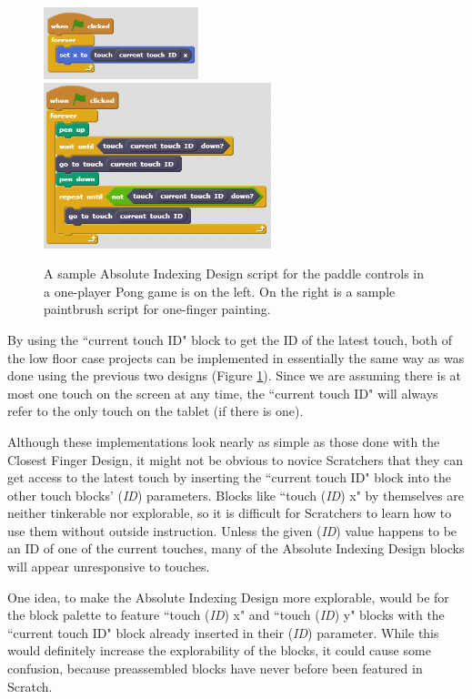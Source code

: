 \begin{figure}
\centering
\includegraphics[width=0.4\textwidth]{images/OnePlayerPongAID.PNG}
\includegraphics[width=0.59\textwidth]{images/OneFingerPaintingAID.PNG}
\caption[Sample Absolute Indexing Design Scripts for Low Floor Case Projects]{A sample Absolute Indexing Design script for the paddle controls in a one-player Pong game is on the left. On the right is a sample paintbrush script for one-finger painting.}
\label{LowFloorAID}
\end{figure}

By using the ``current touch ID" block to get the ID of the latest touch, both of the low floor case projects can be implemented in essentially the same way as was done using the previous two designs (Figure \ref{LowFloorAID}). Since we are assuming there is at most one touch on the screen at any time, the ``current touch ID" will always refer to the only touch on the tablet (if there is one).

Although these implementations look nearly as simple as those done with the Closest Finger Design, it might not be obvious to novice Scratchers that they can get access to the latest touch by inserting the ``current touch ID" block into the other touch blocks' (\emph{ID}) parameters. Blocks like ``touch (\emph{ID}) x" by themselves are neither tinkerable nor explorable, so it is difficult for Scratchers to learn how to use them without outside instruction. Unless the given (\emph{ID}) value happens to be an ID of one of the current touches, many of the Absolute Indexing Design blocks will appear unresponsive to touches.

One idea, to make the Absolute Indexing Design more explorable, would be for the block palette to feature  ``touch (\emph{ID}) x" and ``touch (\emph{ID}) y" blocks with the ``current touch ID" block already inserted in their (\emph{ID}) parameter. While this would definitely increase the explorability of the blocks, it could cause some confusion, because preassembled blocks have never before been featured in Scratch.


